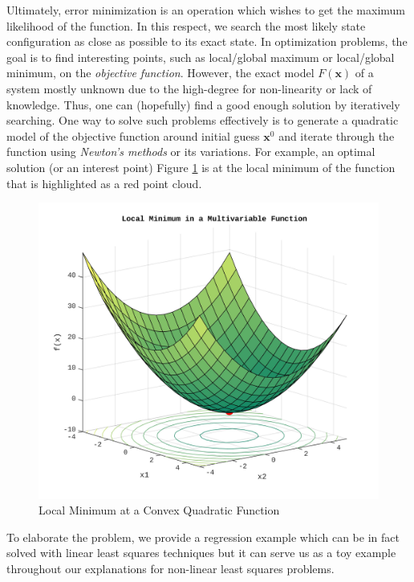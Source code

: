 \documentclass[12pt]{report}
\numberwithin{figure}{section}
\begin{document}
\begin{appendices}
Ultimately, error minimization is an 
operation which wishes to get the maximum likelihood of the function. In this 
respect, 
we search the most 
likely state configuration as close as possible to its exact state. 
In optimization problems,
the goal is to find interesting points, such as local/global
maximum or local/global minimum, on the \textit{objective}
\textit{function}. However, the exact model $F(\mathbf{x})$ of a system 
mostly unknown due to the high-degree for non-linearity or lack of knowledge.
Thus, one can (hopefully) find a good enough solution by iteratively searching.
One way to solve such problems effectively is to generate a quadratic model of 
the objective function around initial guess $\mathbf{x}^0$ and iterate
through the function using \textit{Newton's methods} or its variations.
For example,
an optimal solution (or an interest point)
Figure \ref{fig:lsq_multivariable_function_example} is at the local
minimum of the function that is highlighted as a red point cloud.


\begin{figure}[H]
	\centering
  \includegraphics[width=0.7\linewidth,natwidth=640,natheight=640]
	{fig/lsq_multivariable_function_example.jpg}
	\caption{Local Minimum at a Convex Quadratic Function}
	\label{fig:lsq_multivariable_function_example}
\end{figure}

To elaborate the problem, we provide a regression example 
which can be in fact solved with linear least squares techniques but 
it can serve us 
as a toy example throughout our explanations for non-linear least squares 
problems.


\end{appendices}
\end{document}
